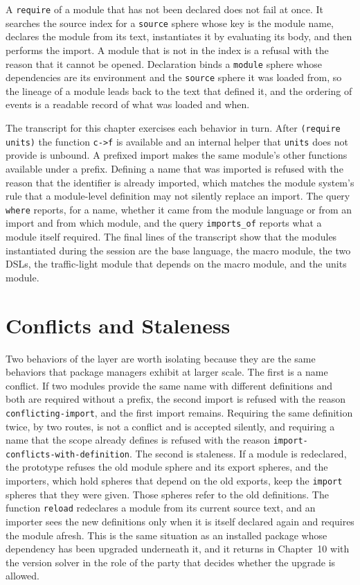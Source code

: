 A \texttt{require} of a module that has not been declared does not fail at once. It searches the source index for a \texttt{source} sphere whose key is the module name, declares the module from its text, instantiates it by evaluating its body, and then performs the import. A module that is not in the index is a refusal with the reason that it cannot be opened. Declaration binds a \texttt{module} sphere whose dependencies are its environment and the \texttt{source} sphere it was loaded from, so the lineage of a module leads back to the text that defined it, and the ordering of events is a readable record of what was loaded and when.


The transcript for this chapter exercises each behavior in turn. After \texttt{(require units)} the function \texttt{c->f} is available and an internal helper that \texttt{units} does not provide is unbound. A prefixed import makes the same module's other functions available under a prefix. Defining a name that was imported is refused with the reason that the identifier is already imported, which matches the module system's rule that a module-level definition may not silently replace an import. The query \texttt{where} reports, for a name, whether it came from the module language or from an import and from which module, and the query \texttt{imports\_of} reports what a module itself required. The final lines of the transcript show that the modules instantiated during the session are the base language, the macro module, the two DSLs, the traffic-light module that depends on the macro module, and the units module.


\section{Conflicts and Staleness}

Two behaviors of the layer are worth isolating because they are the same behaviors that package managers exhibit at larger scale. The first is a name conflict. If two modules provide the same name with different definitions and both are required without a prefix, the second import is refused with the reason \texttt{conflicting-import}, and the first import remains. Requiring the same definition twice, by two routes, is not a conflict and is accepted silently, and requiring a name that the scope already defines is refused with the reason \texttt{import-conflicts-with-definition}. The second is staleness. If a module is redeclared, the prototype refuses the old module sphere and its export spheres, and the importers, which hold spheres that depend on the old exports, keep the \texttt{import} spheres that they were given. Those spheres refer to the old definitions. The function \texttt{reload} redeclares a module from its current source text, and an importer sees the new definitions only when it is itself declared again and requires the module afresh. This is the same situation as an installed package whose dependency has been upgraded underneath it, and it returns in Chapter~10 with the version solver in the role of the party that decides whether the upgrade is allowed.

